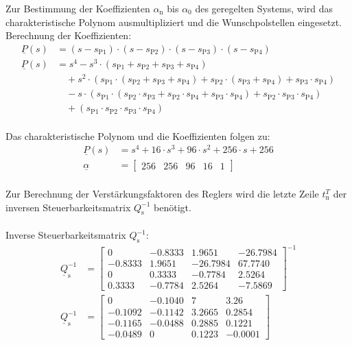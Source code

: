 \documentclass[
	pagesize,
	fontsize=12pt,
	paper=a4,
	oneside,
   reqno
]{scrartcl}
\begin{document}
Zur Bestimmung der Koeffizienten $\alpha_{\mathrm{n}}$ bis $\alpha_{\mathrm{0}}$ des geregelten Systems, wird das charakteristische Polynom ausmultipliziert und die Wunschpolstellen eingesetzt.
Berechnung der Koeffizienten:
\begin{align*}
    \underline{P}(s) &= (s-s_{\mathrm{P1}})\cdot(s-s_{\mathrm{P2}})\cdot(s-s_{\mathrm{P3}})\cdot(s-s_{\mathrm{P4}}) \\
    \underline{P}(s) &= s^4-s^3\cdot(s_{\mathrm{P1}}+s_{\mathrm{P2}}+s_{\mathrm{P3}}+s_{\mathrm{P4}}) \nonumber \\ 
    &\quad +s^2\cdot(s_{\mathrm{P1}}\cdot(s_{\mathrm{P2}}+s_{\mathrm{P3}}+s_{\mathrm{P4}})+s_{\mathrm{P2}}\cdot(s_{\mathrm{P3}}+s_{\mathrm{P4}})+s_{\mathrm{P3}}\cdot s_{\mathrm{P4}}) \nonumber \\
    &\quad -s\cdot(s_{\mathrm{P1}}\cdot(s_{\mathrm{P2}}\cdot s_{\mathrm{P3}}+s_{\mathrm{P2}}\cdot s_{\mathrm{P4}}+s_{\mathrm{P3}}\cdot s_{\mathrm{P4}})+s_{\mathrm{P2}}\cdot s_{\mathrm{P3}}\cdot s_{\mathrm{P4}}) \nonumber \\
    &\quad +(s_{\mathrm{P1}}\cdot s_{\mathrm{P2}}\cdot s_{\mathrm{P3}}\cdot s_{\mathrm{P4}})
\end{align*}\\
Das charakteristische Polynom und die Koeffizienten folgen zu:
\begin{align}
    \underline{P}(s) &= s^4+16\cdot s^3+96\cdot s^2+256\cdot s+256 \nonumber \\
    \underline{\alpha} &=
    \begin{bmatrix}
        256 & 256 & 96 & 16 & 1
    \end{bmatrix} \label{eq:Gleichung38}
\end{align}\\
Zur Berechnung der Verstärkungsfaktoren des Reglers wird die letzte Zeile $t_{\mathrm{n}}^T$ der inversen Steuerbarkeitsmatrix $Q_{\mathrm{s}}^{-1}$ benötigt.\\\\
Inverse Steuerbarkeitsmatrix $Q_{\mathrm{s}}^{-1}$:
\begin{align*}
    \underline{Q}_{\mathrm{s}}^{-1} &=
    \begin{bmatrix}
         0 & -0.8333 & 1.9651 & -26.7984 \\
        -0.8333 & 1.9651 & -26.7984 & 67.7740 \\
        0 & 0.3333 & -0.7784 & 2.5264 \\
        0.3333 & -0.7784 & 2.5264 & -7.5869
    \end{bmatrix}^{-1} \\
    \underline{Q}_{\mathrm{s}}^{-1} &=
    \begin{bmatrix}
        0 & -0.1040 & 7 & 3.26 \\
        -0.1092 & -0.1142 & 3.2665 & 0.2854 \\
        -0.1165 & -0.0488 & 0.2885 & 0.1221 \\
        -0.0489 & 0 & 0.1223 & -0.0001
    \end{bmatrix}
\end{align*}\\
\end{document}
